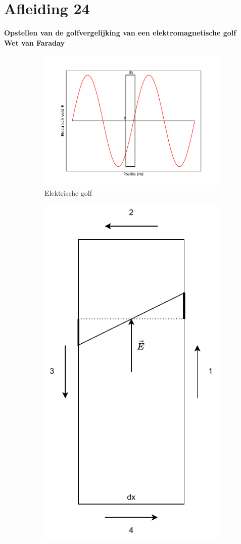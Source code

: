 \documentclass[a4paper,kul]{kulakarticle} %
\begin{document}
\section{Afleiding 24}
\textbf{Opstellen van de golfvergelijking van een elektromagnetische golf}\\
\textbf{Wet van Faraday}\\
\begin{figure}[h]
	\centering
	\begin{subfigure}{.5\textwidth}
		\centering
		\includegraphics[width=1\linewidth]{FaradayGolf}
		\caption[Elektrische golf]{Elektrische golf}
		\label{fig:faradaygolf}
	\end{subfigure}%
	\begin{subfigure}{.5\textwidth}
		\centering
		\includegraphics[width=0.6\linewidth]{InzoomFaraday}

\end{subfigure}
\end{figure}
\end{document}

